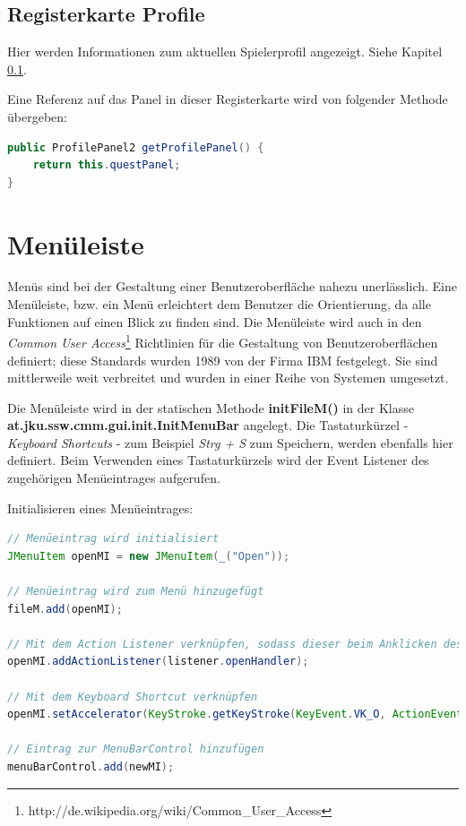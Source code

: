 \subsection{Registerkarte \glqq{}Profile\grqq{}}
Hier werden Informationen zum aktuellen Spielerprofil angezeigt. Siehe Kapitel \ref{}.

Eine Referenz auf das Panel in dieser Registerkarte wird von folgender Methode übergeben:
\begin{lstlisting}[language=JAVA]
public ProfilePanel2 getProfilePanel() {
	return this.questPanel;
}
\end{lstlisting}

\section{Menüleiste}
\label{sec:gui-main-menu}
Menüs sind bei der Gestaltung einer Benutzeroberfläche nahezu unerlässlich. Eine Menüleiste, bzw. ein Menü erleichtert dem Benutzer die Orientierung, da alle Funktionen auf einen Blick zu finden sind. Die Menüleiste wird auch in den \emph{Common User Access}\footnote{http://de.wikipedia.org/wiki/Common\_User\_Access} Richtlinien für die Gestaltung von Benutzeroberflächen definiert; diese Standards wurden 1989 von der Firma IBM festgelegt. Sie sind mittlerweile weit verbreitet und wurden in einer Reihe von Systemen umgesetzt.

Die Menüleiste wird in der statischen Methode \textbf{initFileM()} in der Klasse \\ \textbf{at.jku.ssw.cmm.gui.init.InitMenuBar} angelegt. Die Tastaturkürzel - \emph{\glqq{}Keyboard Shortcuts\grqq{}} - zum Beispiel \emph{Strg + S} zum Speichern, werden ebenfalls hier definiert. Beim Verwenden eines Tastaturkürzels wird der Event Listener des zugehörigen Menüeintrages aufgerufen.

Initialisieren eines Menüeintrages:
\begin{lstlisting}[language=JAVA]
// Menüeintrag wird initialisiert
JMenuItem openMI = new JMenuItem(_("Open"));

// Menüeintrag wird zum Menü hinzugefügt
fileM.add(openMI);

// Mit dem Action Listener verknüpfen, sodass dieser beim Anklicken des Menüs aufgerufen wird
openMI.addActionListener(listener.openHandler);

// Mit dem Keyboard Shortcut verknüpfen
openMI.setAccelerator(KeyStroke.getKeyStroke(KeyEvent.VK_O, ActionEvent.CTRL_MASK));

// Eintrag zur MenuBarControl hinzufügen
menuBarControl.add(newMI);
\end{lstlisting}

